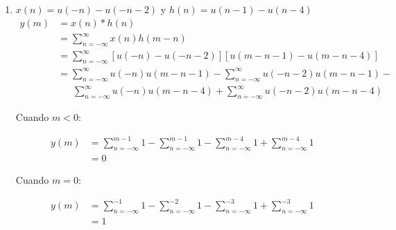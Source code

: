 \documentclass[a4paper,12pt,final]{article}
\begin{document}
\begin{enumerate}[label=\alph*)]
        \item $x\left(n\right) = u\left(-n\right) - u\left(-n-2\right)$ y $h\left(n\right) = u\left(n-1\right) - u\left(n-4\right)$
          \begin{equation*}
            \begin{split}
              y\left(m\right) & = x\left(n\right) * h\left(n\right) \\
                              & = \sum_{n=-\infty}^{\infty} x\left(n\right)h\left(m-n\right) \\
                              & = \sum_{n=-\infty}^{\infty} \left[u\left(-n\right) - u\left(-n-2\right)\right]
                                                            \left[u\left(m-n-1\right) - u\left(m-n-4\right)\right] \\
                              & = \sum_{n=-\infty}^{\infty} u\left(-n\right)u\left(m-n-1\right) - \sum_{n=-\infty}^{\infty} u\left(-n-2\right)u\left(m-n-1\right) - \\
                              & \phantom{=}\ \sum_{n=-\infty}^{\infty} u\left(-n\right)u\left(m-n-4\right) + \sum_{n=-\infty}^{\infty} u\left(-n-2\right)u\left(m-n-4\right)
            \end{split}
          \end{equation*}
          \vfill
          \newpage

          \noindent Cuando $m<0$:

          \begin{equation*}
            \begin{split}
              y\left(m\right) & = \sum_{n=-\infty}^{m-1} 1 -
                                  \sum_{n=-\infty}^{m-1} 1 -
                                  \sum_{n=-\infty}^{m-4} 1 +
                                  \sum_{n=-\infty}^{m-4} 1 \\
                              & = 0
            \end{split}
          \end{equation*}

          \noindent Cuando $m=0$:

          \begin{equation*}
            \begin{split}
              y\left(m\right) & = \sum_{n=-\infty}^{-1} 1 -
                                  \sum_{n=-\infty}^{-2} 1 -
                                  \sum_{n=-\infty}^{-3} 1 +
                                  \sum_{n=-\infty}^{-3} 1 \\
                              & = 1
            \end{split}
          \end{equation*}


\end{enumerate}
\end{document}
